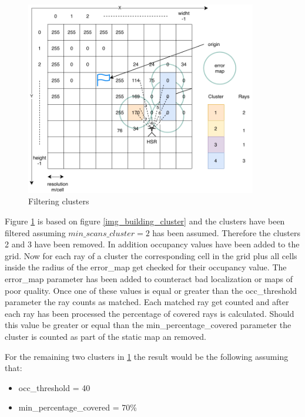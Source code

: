 \documentclass[main.tex]{subfiles}
\begin{document}
		\begin{figure}[H]
			\centering
			\includegraphics[width=0.9\textwidth]{pictures/obstacle_finder/Cluster-Filter.pdf}
			\caption{Filtering clusters}
			\label{img_filter_cluster}
		\end{figure}
	
		Figure \ref{img_filter_cluster} is based on figure \ref{img_building_cluster} and the clusters have been filtered assuming $min\_scans\_cluster = 2$ has been assumed. Therefore the clusters 2 and 3 have been removed. In addition occupancy values have been added to the grid. Now for each ray of a cluster the corresponding cell in the grid plus all cells inside the radius of the error\_map get checked for their occupancy value. The error\_map parameter has been added to counteract bad localization or maps of poor quality.  Once one of these values is equal or greater than the occ\_threshold parameter the ray counts as matched. Each matched ray get counted and after each ray has been processed the percentage of covered rays is calculated. Should this value be greater or equal than the min\_percentage\_covered parameter the cluster is counted as part of the static map an removed.
		
		For the remaining two clusters in \ref{img_filter_cluster} the result would be the following assuming that:
		\begin{itemize}
			\item occ\_threshold = 40
			\item min\_percentage\_covered = 70\%
		\end{itemize}
	
\end{document}
